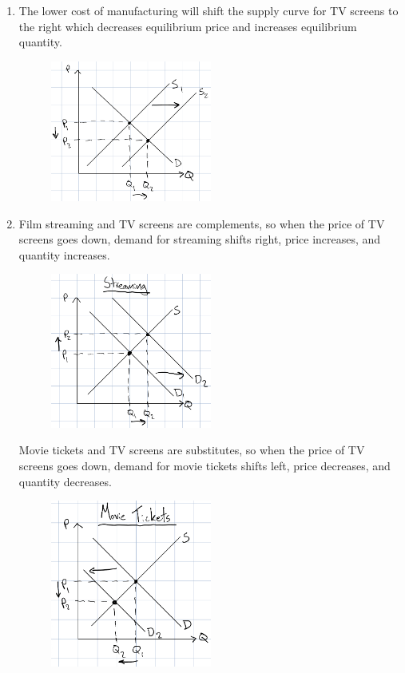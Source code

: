 \documentclass{article}
\begin{document}
\begin{enumerate}
\begin{enumerate}
	\item The lower cost of manufacturing will shift the supply curve for TV screens to the right which decreases equilibrium price and increases equilibrium quantity.
	\begin{figure}[h]
	\centering
	\includegraphics[width = 0.5\textwidth]{problem7a}
	\end{figure}
	
	\item Film streaming and TV screens are complements, so when the price of TV screens goes down, demand for streaming shifts right, price increases, and quantity increases.
	\begin{figure}[h]
	\centering
	\includegraphics[width = 0.5\textwidth]{problem7b_streaming}
	\end{figure}
	
	Movie tickets and TV screens are substitutes, so when the price of TV screens goes down, demand for movie tickets shifts left, price decreases, and quantity decreases.
	\begin{figure}[h]
	\centering
	\includegraphics[width = 0.5\textwidth]{problem7b_tix}
	\end{figure}
	

\end{enumerate}
\end{enumerate}
\end{document}
